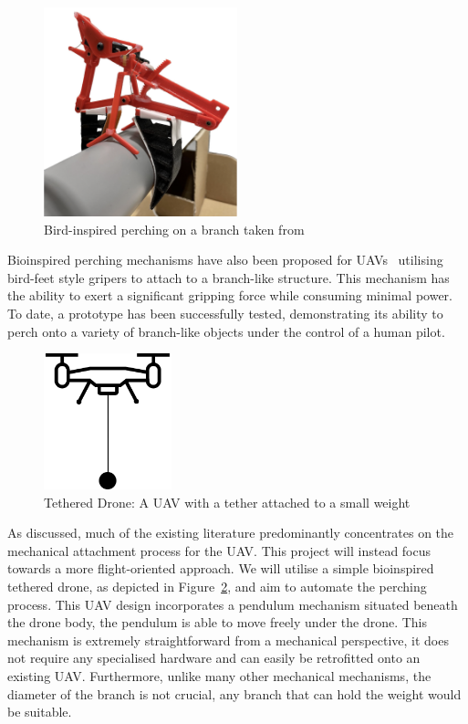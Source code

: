 \begin{figure}[htbp]
  \centering
  \includegraphics[width=0.5\textwidth]{background/perching-tum.png}
  \caption{Bird-inspired perching on a branch taken from~\cite{perching-tum-bird}}
\label{fig:perching-tum-bird}
\end{figure}

Bioinspired perching mechanisms have also been proposed for UAVs~\cite{perching-tum-bird} utilising bird-feet style gripers to attach to a branch-like structure.
This mechanism has the ability to exert a significant gripping force while consuming minimal power.
To date, a prototype has been successfully tested, demonstrating its ability to perch onto a variety of branch-like objects under the control of a human pilot.

\begin{figure}[htbp]
  \centering
  \includegraphics[width=0.33\textwidth]{introduction/TetheredDrone.drawio.png}
  \caption{Tethered Drone: A UAV with a tether attached to a small weight}
\label{fig:background-tethered-drone}
\end{figure}

As discussed, much of the existing literature predominantly concentrates on the mechanical attachment process for the UAV.
This project will instead focus towards a more flight-oriented approach.
We will utilise a simple bioinspired tethered drone, as depicted in Figure~\ref{fig:background-tethered-drone}, and aim to automate the perching process.
This UAV design incorporates a pendulum mechanism situated beneath the drone body, the pendulum is able to move freely under the drone.
This mechanism is extremely straightforward from a mechanical perspective, it does not require any specialised hardware and can easily be retrofitted onto an existing UAV.
Furthermore, unlike many other mechanical mechanisms, the diameter of the branch is not crucial, any branch that can hold the weight would be suitable.

